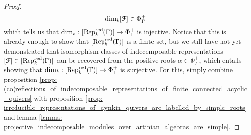 \begin{proof}
                        $$\dim_k [\mathcal{F}] \in \Phi_{\Gamma}^+$$
                    which tells us that $\dim_k: [\mathrm{Rep}_k^{\mathrm{red}}(\Gamma)] \to \Phi_{\Gamma}^+$ is injective. Notice that this is already enough to show that $[\mathrm{Rep}_k^{\mathrm{red}}(\Gamma)]$ is a finite set, but we still have not yet demonstrated that isomorphism classes of indecomposable representations $[\mathcal{F}] \in [\mathrm{Rep}_k^{\mathrm{red}}(\Gamma)]$ can be recovered from the positive roots $\alpha \in \Phi_{\Gamma}^+$, which entails showing that $\dim_k: [\mathrm{Rep}_k^{\mathrm{red}}(\Gamma)] \to \Phi_{\Gamma}^+$ is surjective. For this, simply combine proposition \ref{prop: (co)reflections_of_indecomposable_representations_of_finite_connected_acyclic_quivers} with proposition \ref{prop: irreducible_representations_of_dynkin_quivers_are_labelled_by_simple_roots} and lemma \ref{lemma: projective_indecomposable_modules_over_artinian_algebras_are_simple}.
                \end{proof}
        
